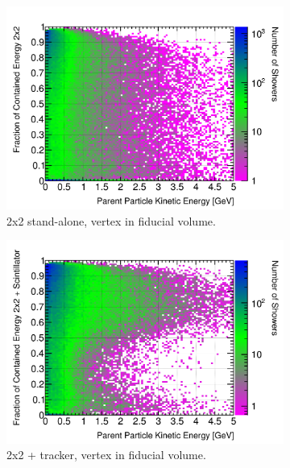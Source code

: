 \documentclass[10pt,a4paper,openany]{article}
\begin{document}
\begin{figure}[htbp]
\begin{subfigure}[b]{0.49\textwidth}
	\end{subfigure}	
	\begin{subfigure}[b]{0.49\textwidth}
		\centering
    \includegraphics[width=1.0\textwidth]{Pi0_contained_frac_2x2_fiducial.png}
		\caption{2x2 stand-alone, vertex in fiducial volume.}
		\label{}
	\end{subfigure}	
	\hfill
	\begin{subfigure}[b]{0.49\textwidth}
		\centering
		\includegraphics[width=1.0\textwidth]{Pi0_contained_frac_2x2_Scintillator_fiducial_gap.png}
		\caption{2x2 + tracker, vertex in fiducial volume.}
		\label{}
	\end{subfigure}
	\begin{subfigure}[b]{0.49\textwidth}
		\centering

\end{subfigure}
\end{figure}
\end{document}
